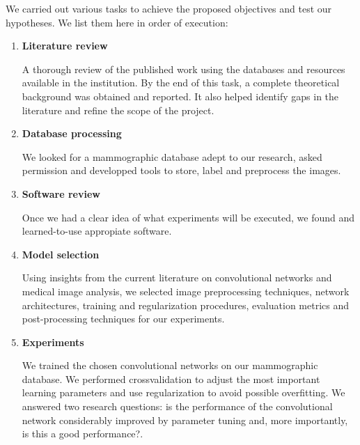 We carried out various tasks to achieve the proposed objectives and test our hypotheses. We list them here in order of execution:
\begin{enumerate}
	\item \textbf{Literature review}

A thorough review of the published work using the databases and resources available in the institution. By the end of this task, a complete theoretical background was obtained and reported. It also helped identify gaps in the literature and refine the scope of the project.
	\item \textbf{Database processing}

We looked for a mammographic database adept to our research, asked permission and developped tools to store, label and preprocess the images.
	\item \textbf{Software review}

Once we had a clear idea of what experiments will be executed, we found and learned-to-use appropiate software. 

\begin{comment}
	\item \textbf{Exploratory experiments}

We will train a standard convolutional networks with fixed parameters for the detection of microcalcifications and the detection of masses. We want to answer whether the convolutional network is powerful enough to learn the task in hand, whether we have enough data for the network to learn or more data augmentation is needed and wether the computational resources and parameter settings allow the network to learn in a timely fashion.
\end{comment}
	\item \textbf{Model selection}

Using insights from the current literature on convolutional networks and medical image analysis, we selected image preprocessing techniques, network architectures, training and regularization procedures, evaluation metrics and post-processing techniques for our experiments.
	\item \textbf{Experiments}
	
We trained the chosen convolutional networks on our mammographic database. We performed crossvalidation to adjust the most important learning parameters and use regularization to avoid possible overfitting. We answered two research questions: is the performance of the convolutional network considerably improved by parameter tuning and, more importantly, is this a good performance?.
	

\end{enumerate}
